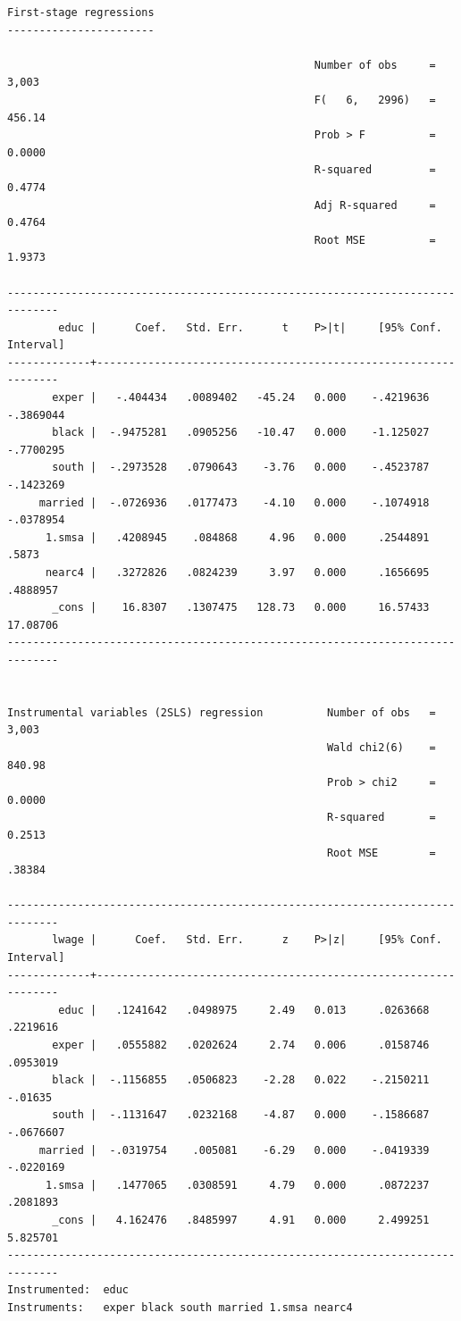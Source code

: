 \documentclass[
]{book}
\begin{document}
\begin{verbatim}
First-stage regressions
-----------------------

                                                Number of obs     =      3,003
                                                F(   6,   2996)   =     456.14
                                                Prob > F          =     0.0000
                                                R-squared         =     0.4774
                                                Adj R-squared     =     0.4764
                                                Root MSE          =     1.9373

------------------------------------------------------------------------------
        educ |      Coef.   Std. Err.      t    P>|t|     [95% Conf. Interval]
-------------+----------------------------------------------------------------
       exper |   -.404434   .0089402   -45.24   0.000    -.4219636   -.3869044
       black |  -.9475281   .0905256   -10.47   0.000    -1.125027   -.7700295
       south |  -.2973528   .0790643    -3.76   0.000    -.4523787   -.1423269
     married |  -.0726936   .0177473    -4.10   0.000    -.1074918   -.0378954
      1.smsa |   .4208945    .084868     4.96   0.000     .2544891       .5873
      nearc4 |   .3272826   .0824239     3.97   0.000     .1656695    .4888957
       _cons |    16.8307   .1307475   128.73   0.000     16.57433    17.08706
------------------------------------------------------------------------------


Instrumental variables (2SLS) regression          Number of obs   =      3,003
                                                  Wald chi2(6)    =     840.98
                                                  Prob > chi2     =     0.0000
                                                  R-squared       =     0.2513
                                                  Root MSE        =     .38384

------------------------------------------------------------------------------
       lwage |      Coef.   Std. Err.      z    P>|z|     [95% Conf. Interval]
-------------+----------------------------------------------------------------
        educ |   .1241642   .0498975     2.49   0.013     .0263668    .2219616
       exper |   .0555882   .0202624     2.74   0.006     .0158746    .0953019
       black |  -.1156855   .0506823    -2.28   0.022    -.2150211     -.01635
       south |  -.1131647   .0232168    -4.87   0.000    -.1586687   -.0676607
     married |  -.0319754    .005081    -6.29   0.000    -.0419339   -.0220169
      1.smsa |   .1477065   .0308591     4.79   0.000     .0872237    .2081893
       _cons |   4.162476   .8485997     4.91   0.000     2.499251    5.825701
------------------------------------------------------------------------------
Instrumented:  educ
Instruments:   exper black south married 1.smsa nearc4
\end{verbatim}
\end{document}
